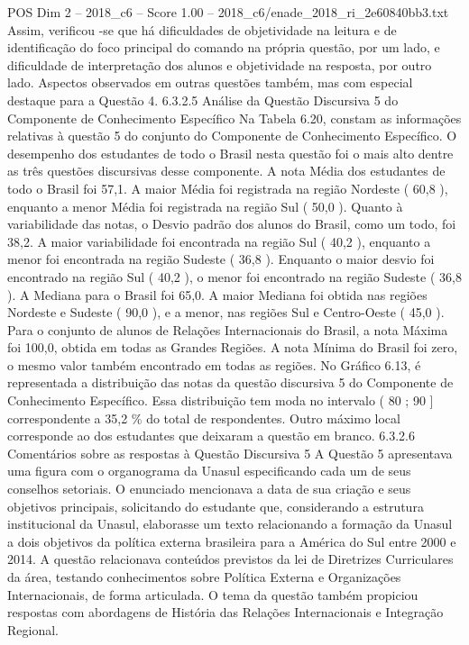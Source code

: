 \begin{textsample}{POS Dim 2 – 2018\_c6 – Score 1.00 – 2018\_c6/enade\_2018\_ri\_2e60840bb3.txt}
Assim, verificou -se que há dificuldades de objetividade na leitura e de identificação do foco principal do comando na própria questão, por um lado, e dificuldade de interpretação dos alunos e objetividade na resposta, por outro lado.
Aspectos observados em outras questões também, mas com especial destaque para a Questão 4. 6.3.2.5 Análise da Questão Discursiva 5 do Componente de Conhecimento Específico Na Tabela 6.20, constam as informações relativas à questão 5 do conjunto do Componente de Conhecimento Específico.
O desempenho dos estudantes de todo o Brasil nesta questão foi o mais alto dentre as três questões discursivas desse componente.
A nota Média dos estudantes de todo o Brasil foi 57,1.
A maior Média foi registrada na região Nordeste ( 60,8 ), enquanto a menor Média foi registrada na região Sul ( 50,0 ).
Quanto à variabilidade das notas, o Desvio padrão dos alunos do Brasil, como um todo, foi 38,2.
A maior variabilidade foi encontrada na região Sul ( 40,2 ), enquanto a menor foi encontrada na região Sudeste ( 36,8 ).
Enquanto o maior desvio foi encontrado na região Sul ( 40,2 ), o menor foi encontrado na região Sudeste ( 36,8 ).
A Mediana para o Brasil foi 65,0.
A maior Mediana foi obtida nas regiões Nordeste e Sudeste ( 90,0 ), e a menor, nas regiões Sul e Centro-Oeste ( 45,0 ).
Para o conjunto de alunos de Relações Internacionais do Brasil, a nota Máxima foi 100,0, obtida em todas as Grandes Regiões.
A nota Mínima do Brasil foi zero, o mesmo valor também encontrado em todas as regiões.
No Gráfico 6.13, é representada a distribuição das notas da questão discursiva 5 do Componente de Conhecimento Específico.
Essa distribuição tem moda no intervalo ( 80 ; 90 ] correspondente a 35,2 \% do total de respondentes.
Outro máximo local corresponde ao dos estudantes que deixaram a questão em branco. 6.3.2.6 Comentários sobre as respostas à Questão Discursiva 5 A Questão 5 apresentava uma figura com o organograma da Unasul especificando cada um de seus conselhos setoriais.
O enunciado mencionava a data de sua criação e seus objetivos principais, solicitando do estudante que, considerando a estrutura institucional da Unasul, elaborasse um texto relacionando a formação da Unasul a dois objetivos da política externa brasileira para a América do Sul entre 2000 e 2014.
A questão relacionava conteúdos previstos da lei de Diretrizes Curriculares da área, testando conhecimentos sobre Política Externa e Organizações Internacionais, de forma articulada.
O tema da questão também propiciou respostas com abordagens de História das Relações Internacionais e Integração Regional.

\end{textsample}
